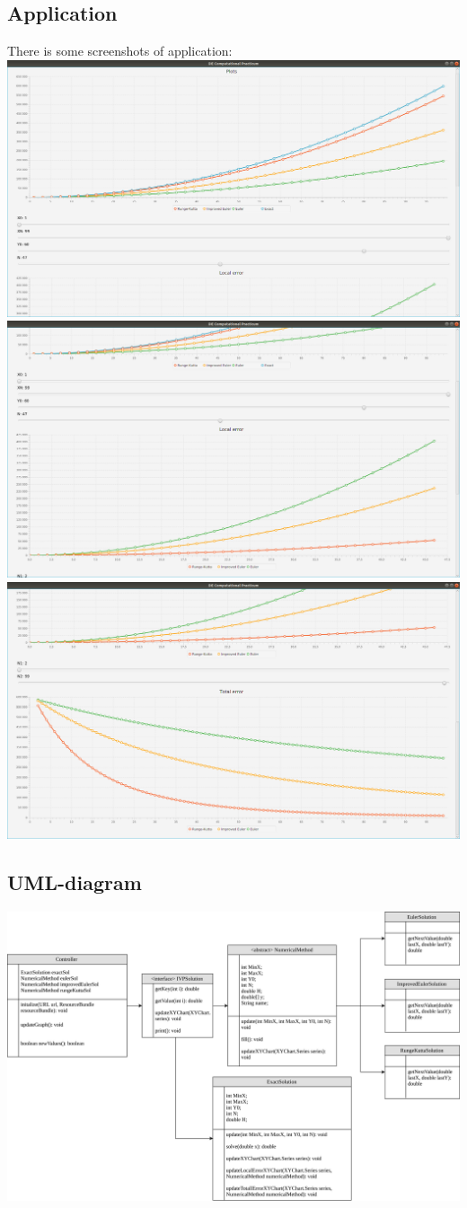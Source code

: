 \documentclass{article}
\begin{document}
\subsection{Application}
There is some screenshots of application:
\includegraphics[scale=0.2]{Plots.png}
\includegraphics[scale=0.2]{LocalErrors.png}
\includegraphics[scale=0.2]{TotalErrors.png}
\subsection{UML-diagram}
\includegraphics[scale=0.5]{UML.png}
\end{document}
